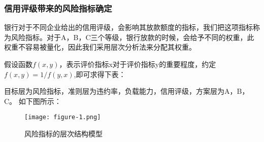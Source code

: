 \documentclass[dvipsnames,withoutpreface,bwprint]{cumcmthesis}
\begin{document}
\subsubsection{信用评级带来的风险指标确定}
银行对于不同企业给出的信用评级，会影响其放款额度的指标，我们把这项指标称为风险指标。对于A，B，C三个等级，银行放款的时候，会给予不同的权重，此权重不容易被量化，因此我们采用层次分析法来分配其权重。
\par 假设函数$f(x,y)$，表示评价指标x对于评价指标y的重要程度，约定$f(x,y)=1/f(y,x)$,即可求得下表： 
\begin{table}[H]   
    \caption{层次分析法的重要程度指标}
\end{table}
目标层为风险指标，准则层为违约率，负载能力，信用评级，方案层为A，B，C。
如下图所示：
\begin{figure}[H]
    \centering
    \texttt{[image: figure-1.png]}
    \caption{风险指标的层次结构模型}
    \label{fig:2}%
\end{figure}
\end{document}
